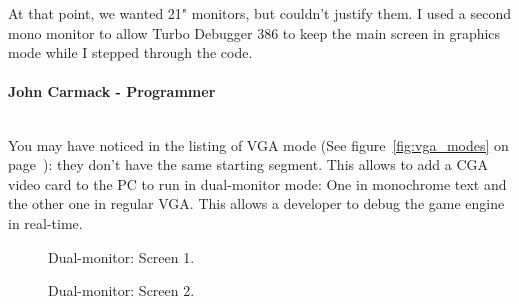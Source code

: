 \documentclass[book.tex]{subfiles}
\begin{document}
\begin{fancyquotes}
At that point, we wanted 21" monitors, but couldn't justify them.  I used a second mono monitor to allow Turbo Debugger 386 to keep the main screen in graphics mode while I stepped through the code.\\
 \\
\textbf{John Carmack - Programmer}
\end{fancyquotes}
\\
You may have noticed in the listing of VGA mode (See figure~\ref{fig:vga_modes} on page~\pageref{fig:vga_modes}): they don't have the same starting segment. This allows to add a CGA video card to the PC to run in dual-monitor mode: One in monochrome text and the other one in regular VGA. This allows a developer to debug the game engine in real-time.\\
\begin{figure}[H]
\centering
\caption{Dual-monitor: Screen 1.}
\label{fig:dm1}
\end{figure}

\begin{figure}[H]
\centering
\caption{Dual-monitor: Screen 2.}
\label{fig:dm1}
\end{figure}
\end{document}

